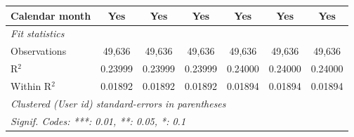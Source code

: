 \begin{table}[htbp]
\begin{footnotesize}
\begin{tabular}{lcccccc}
         Calendar month      & Yes           & Yes           & Yes           & Yes           & Yes           & Yes\\
         \midrule \emph{Fit statistics} &   &   &   &   &   &  \\
         Observations        & 49,636        & 49,636        & 49,636        & 49,636        & 49,636        & 49,636\\
         R$^2$               & 0.23999       & 0.23999       & 0.23999       & 0.24000       & 0.24000       & 0.24000\\
         Within R$^2$        & 0.01892       & 0.01892       & 0.01892       & 0.01894       & 0.01894       & 0.01894\\
         \midrule\midrule\multicolumn{7}{l}{\emph{Clustered (User id) standard-errors in parentheses}}\\
         \multicolumn{7}{l}{\emph{Signif. Codes: ***: 0.01, **: 0.05, *: 0.1}}\\
      \end{tabular}
   \end{footnotesize}
\end{table}


